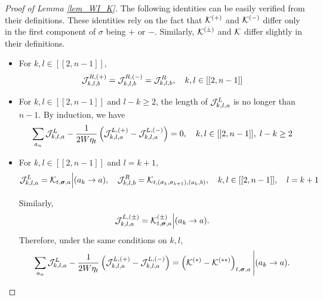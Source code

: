\documentclass[10pt,reqno]{article}
\theoremstyle{plain} %
\theoremstyle{remark}
\numberwithin{equation}{section}
\begin{document}
\begin{proof}[Proof of Lemma \ref{lem_WI_K}]
The following  identities  can be easily verified from their definitions. These identities rely on the fact that ${\cal K}^{(+)}$ and ${\cal K}^{(-)}$ differ only in the first component of $\sigma$  being $+$ or  $-$. Similarly, ${\cal K}^{(\pm)}$ and ${\cal K}$ differ slightly in their definitions. 

\begin{itemize}
    \item  For $k,l\in[[2, n-1]]$,  
 \begin{equation}\label{kdjuwsz}
  {\cal J}^{R,(+)}_{k,l,b}=  {\cal J}^{R,(-)}_{k,l,b}={\cal J}^{R }_{k,l,b} ,\quad k,l\in[[2, n-1]]   
 \end{equation}

\item For $k,l\in[[2, n-1]]$ and $ l-k  \ge 2$, the length of  $ {\cal J}^{L }_{k,l,a} $ is no longer than  $ n-1$. By induction, we have 
\begin{equation}\label{a';slw}
    \sum_{a_n}{\cal J}^{L}_{k,l,a}-\frac{1}{2W\eta_t}\left({\cal J}^{L,(+)}_{k,l,a} -{\cal J}^{L,(-)}_{k,l,a} \right)=0 ,\quad  k,l\in[[2, n-1]], \;  l-k \ge 2
\end{equation}


\item For $k,l\in[[2, n-1]]$ and $l=k+1$,
 $$
{\cal J}^L_{k,l,a} ={\cal K}_{t, \boldsymbol{\sigma}, \textbf{a}}\Big|(a_k\to a)
 ,\quad  {\cal J}^R_{k,l,b}={\cal K}_{t, (\sigma_k, \sigma_{k+1}), (a_k, b)},\quad k,l\in[[2, n-1]],\quad l=k+1
$$
 
Similarly, 
$$
{\cal J}^{L,(\pm)}_{k,l,a} ={\cal K}^{(\pm)}_{t, \boldsymbol{\sigma}, \textbf{a}}\Big|(a_k\to a).
$$
Therefore, under the same conditions on $k, l$, 
\begin{equation}\label{uaiw03}
    \sum_{a_n}{\cal J}^{L}_{k,l,a}-\frac{1}{2W\eta_t}\left({\cal J}^{L,(+)}_{k,l,a} -{\cal J}^{L,(-)}_{k,l,a} \right)=
    \left({\cal K}^{(*)}-{\cal K}^{(**)}\right)_{t, \boldsymbol{\sigma}, \textbf{a}}\Bigg|(a_k\to a). %
\end{equation}

 
\end{itemize}


\end{proof}
\end{document}
